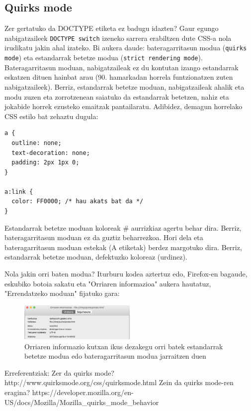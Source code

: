 
\subsection{Quirks mode}
Zer gertatuko da DOCTYPE etiketa ez badugu idazten?
Gaur egungo nabigatzaileek \texttt{DOCTYPE switch} izeneko sarrera erabiltzen dute CSS-a nola irudikatu jakin ahal izateko. Bi aukera daude: bateragarritasun modua (\texttt{quirks mode}) eta estandarrak betetze modua (\texttt{strict rendering mode}). Bateragarritasun moduan, nabigatzaileak ez du kontutan izango estandarrak eskatzen dituen hainbat arau (90. hamarkadan horrela funtzionatzen zuten nabigatzaileek). Berriz, estandarrak betetze moduan, nabigatzaileak ahalik eta modu zuzen eta zorrotzenean saiatuko da estandarrak betetzen, nahiz eta jokabide horrek ezusteko emaitzak pantailaratu. Adibidez, demagun horrelako CSS estilo bat zehaztu dugula:

\begin{minipage}{\linewidth}
\begin{lstlisting}
a {
  outline: none;
  text-decoration: none;
  padding: 2px 1px 0;
}

a:link {
  color: FF0000; /* hau akats bat da */
}
\end{lstlisting}
\end{minipage}

Estandarrak betetze moduan koloreak \# aurrizkiaz agertu behar dira. Berriz, bateragarritasun moduan ez da guztiz beharrezkoa.  Hori dela eta bateragarritasun moduan estekak (A etiketak) berdez margotuko dira. Berriz, estandarrak betetze moduan, defektuzko koloreaz (urdinez).

Nola jakin orri baten modua? Iturburu kodea aztertuz edo, Firefox-en bagaude, eskubiko botoia sakatu eta "Orriaren informazioa" aukera hautatuz, "Errendatzeko moduan" fijatuko gara:

\begin{figure}[ht]
	\centering
\includegraphics[trim=0cm 1cm 0cm 0cm, clip=true, width=0.5\textwidth]{img/quirks}
\caption{Orriaren informazio kutxan ikus dezakegu orri batek estandarrak betetze modua edo bateragarritasun modua jarraitzen duen}
\label{fig:quirksmode}
\end{figure}

Erreferentziak: 
Zer da quirks mode? http://www.quirksmode.org/css/quirksmode.html
Zein da quirks mode-ren eragina? https://developer.mozilla.org/en-US/docs/Mozilla/Mozilla\_quirks\_mode\_behavior
